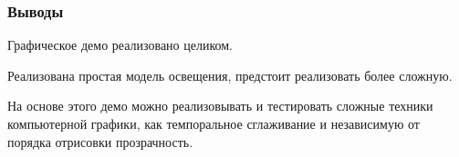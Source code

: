 \begin{frame}
    \frametitle{Выводы}
    Графическое демо реализовано целиком.

    Реализована простая модель освещения,
    предстоит реализовать более сложную.

    На основе этого демо можно реализовывать
    и тестировать сложные техники компьютерной графики,
    как темпоральное сглаживание
    и независимую от порядка отрисовки прозрачность.
\end{frame}
